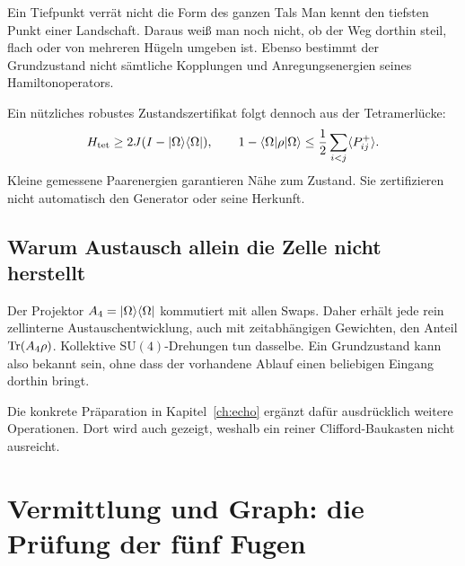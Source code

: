 \begin{bild}{Ein Tiefpunkt verrät nicht die Form des ganzen Tals}
Man kennt den tiefsten Punkt einer Landschaft. Daraus weiß man noch nicht, ob der Weg dorthin steil, flach oder von mehreren Hügeln umgeben ist. Ebenso bestimmt der Grundzustand nicht sämtliche Kopplungen und Anregungsenergien seines Hamiltonoperators.
\end{bild}

Ein nützliches robustes Zustandszertifikat folgt dennoch aus der Tetramerlücke:
\begin{equation}
H_{\mathrm{tet}}\ge2J(I-\lvert\Omega\rangle\langle\Omega\rvert),\qquad
1-\langle\Omega\rvert\rho\lvert\Omega\rangle\le\frac12\sum_{i<j}\langle P^+_{ij}\rangle.
\end{equation}
Kleine gemessene Paarenergien garantieren Nähe zum Zustand. Sie zertifizieren nicht automatisch den Generator oder seine Herkunft.

\section{Warum Austausch allein die Zelle nicht herstellt}
Der Projektor $A_4=\lvert\Omega\rangle\langle\Omega\rvert$ kommutiert mit allen Swaps. Daher erhält jede rein zellinterne Austauschentwicklung, auch mit zeitabhängigen Gewichten, den Anteil $\operatorname{Tr}(A_4\rho)$. Kollektive $\mathrm{SU}(4)$-Drehungen tun dasselbe. Ein Grundzustand kann also bekannt sein, ohne dass der vorhandene Ablauf einen beliebigen Eingang dorthin bringt.

Die konkrete Präparation in Kapitel~\ref{ch:echo} ergänzt dafür ausdrücklich weitere Operationen. Dort wird auch gezeigt, weshalb ein reiner Clifford-Baukasten nicht ausreicht.

\chapter{Vermittlung und Graph: die Prüfung der fünf Fugen}
\label{ch:fugen}
